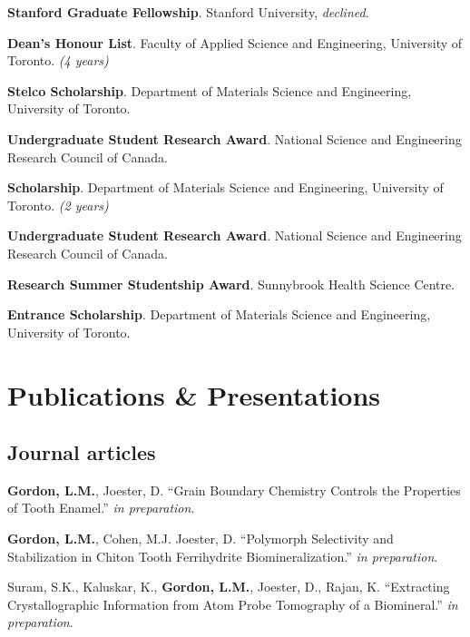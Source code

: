 \textbf{Stanford Graduate Fellowship}. Stanford University, \emph{declined}.

\textbf{Dean's Honour List}. Faculty of Applied Science and Engineering, University of Toronto. \emph{(4 years)}

\textbf{Stelco Scholarship}. Department of Materials Science and Engineering, University of Toronto.

\textbf{Undergraduate Student Research Award}. National Science and Engineering Research Council of Canada. 

\textbf{Scholarship}. Department of Materials Science and Engineering, University of Toronto. \emph{(2 years)}

\textbf{Undergraduate Student Research Award}. National Science and Engineering Research Council of Canada. 

\textbf{Research Summer Studentship Award}. Sunnybrook Health Science Centre.

\textbf{Entrance Scholarship}. Department of Materials Science and Engineering, University of Toronto.
\endgroup

\section*{Publications \& Presentations}



\subsection*{Journal articles}
\textbf{Gordon, L.M.}, Joester, D. “Grain Boundary Chemistry Controls the Properties of Tooth Enamel.” \emph{in preparation}.

\textbf{Gordon, L.M.}, Cohen, M.J. Joester, D. “Polymorph Selectivity and Stabilization in Chiton Tooth Ferrihydrite Biomineralization.” \emph{in preparation}.

\begingroup\setlength{\parskip}{0.15cm}
Suram, S.K., Kaluskar, K., \textbf{Gordon, L.M.}, Joester, D., Rajan, K. “Extracting Crystallographic Information from Atom Probe Tomography of a Biomineral.” \emph{in preparation}.

